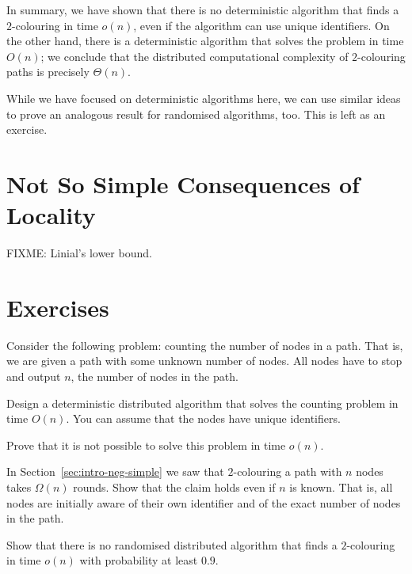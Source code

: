 In summary, we have shown that there is no deterministic algorithm that finds a $2$-colouring in time $o(n)$, even if the algorithm can use unique identifiers. On the other hand, there is a deterministic algorithm that solves the problem in time $O(n)$; we conclude that the distributed computational complexity of $2$-colouring paths is precisely $\Theta(n)$.

While we have focused on deterministic algorithms here, we can use similar ideas to prove an analogous result for randomised algorithms, too. This is left as an exercise.


\section{Not So Simple Consequences of Locality}

FIXME: Linial's lower bound.


\section{Exercises}

\begin{ex}[counting]
    Consider the following problem: counting the number of nodes in a path. That is, we are given a path with some unknown number of nodes. All nodes have to stop and output $n$, the number of nodes in the path.
    \begin{subex}
        \item Design a deterministic distributed algorithm that solves the counting problem in time $O(n)$. You can assume that the nodes have unique identifiers.
        \item Prove that it is not possible to solve this problem in time $o(n)$.
    \end{subex}
\end{ex}

\begin{ex}[known $n$]
    In Section~\ref{sec:intro-neg-simple} we saw that $2$-colouring a path with $n$ nodes takes $\Omega(n)$    rounds. Show that the claim holds even if $n$ is known. That is, all nodes are initially aware of their own identifier and of the exact number of nodes in the path.
\end{ex}

\begin{ex}
    Show that there is no randomised distributed algorithm that finds a $2$-colouring in time $o(n)$ with probability at least $0.9$.
\end{ex}

